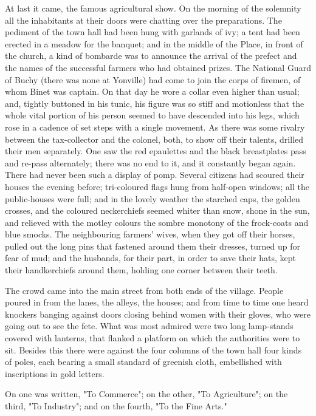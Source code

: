 \documentclass{tufte-book}
\begin{document}
At last it came, the famous agricultural show. On the morning of the
solemnity all the inhabitants at their doors were chatting over the
preparations. The pediment of the town hall had been hung with garlands
of ivy; a tent had been erected in a meadow for the banquet; and in the
middle of the Place, in front of the church, a kind of bombarde was
to announce the arrival of the prefect and the names of the successful
farmers who had obtained prizes. The National Guard of Buchy (there was
none at Yonville) had come to join the corps of firemen, of whom Binet
was captain. On that day he wore a collar even higher than usual; and,
tightly buttoned in his tunic, his figure was so stiff and motionless
that the whole vital portion of his person seemed to have descended into
his legs, which rose in a cadence of set steps with a single movement.
As there was some rivalry between the tax-collector and the colonel,
both, to show off their talents, drilled their men separately. One
saw the red epaulettes and the black breastplates pass and re-pass
alternately; there was no end to it, and it constantly began again.
There had never been such a display of pomp. Several citizens had
scoured their houses the evening before; tri-coloured flags hung from
half-open windows; all the public-houses were full; and in the lovely
weather the starched caps, the golden crosses, and the coloured
neckerchiefs seemed whiter than snow, shone in the sun, and relieved
with the motley colours the sombre monotony of the frock-coats and blue
smocks. The neighbouring farmers' wives, when they got off their horses,
pulled out the long pins that fastened around them their dresses, turned
up for fear of mud; and the husbands, for their part, in order to save
their hats, kept their handkerchiefs around them, holding one corner
between their teeth.

The crowd came into the main street from both ends of the village.
People poured in from the lanes, the alleys, the houses; and from time
to time one heard knockers banging against doors closing behind women
with their gloves, who were going out to see the fete. What was most
admired were two long lamp-stands covered with lanterns, that flanked a
platform on which the authorities were to sit. Besides this there were
against the four columns of the town hall four kinds of poles,
each bearing a small standard of greenish cloth, embellished with
inscriptions in gold letters.

On one was written, "To Commerce"; on the other, "To Agriculture"; on
the third, "To Industry"; and on the fourth, "To the Fine Arts."
\end{document}

